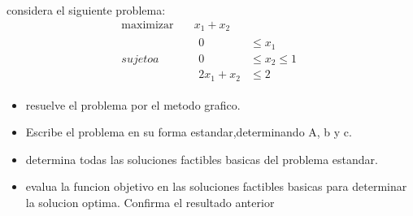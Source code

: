 \documentclass{article}
\begin{document}
considera el siguiente problema:
\begin{equation}
\begin{aligned}
  \text{maximizar}\quad & x_1+x_2\\
  sujeto a \quad &
  \begin{aligned}
    0&\leq x_1\\
    0&\leq x_2\leq1\\
    2x_1+x_2& \leq2
    \end{aligned}
\end{aligned}
\end{equation}

\begin{itemize}

  \item resuelve el problema por el metodo grafico.
  \item Escribe el problema en su forma estandar,determinando A, b y c.
  \item determina todas las soluciones factibles basicas del problema estandar.
  \item evalua la funcion objetivo en las soluciones factibles basicas para determinar la solucion optima. Confirma el resultado anterior
 \end{itemize}
\end{document}
